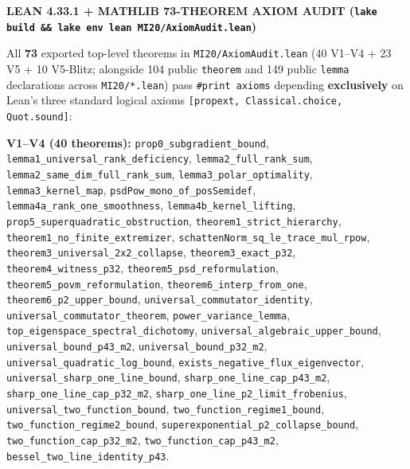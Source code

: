 \documentclass[10pt,letterpaper]{article}
\begin{document}
\begin{tcolorbox}[leanbox]
{\sffamily\footnotesize\bfseries\color{leanborder}LEAN 4.33.1 + MATHLIB 73-THEOREM AXIOM AUDIT (\texttt{lake build \&\& lake env lean MI20/AxiomAudit.lean})}\par\vspace{2.5pt}
{\raggedright\small All \textbf{73} exported top-level theorems in \texttt{MI20/AxiomAudit.lean} (40 V1--V4 + 23 V5 + 10 V5-Blitz; alongside 104 public \texttt{theorem} and 149 public \texttt{lemma} declarations across \texttt{MI20/*.lean}) pass \texttt{\#print axioms} depending \textbf{exclusively} on Lean's three standard logical axioms \texttt{[propext, Classical.choice, Quot.sound]}:\par\vspace{1.5pt}
\textbf{V1--V4 (40 theorems):} \texttt{prop0\_subgradient\_bound}, \texttt{lemma1\_universal\_rank\_deficiency}, \texttt{lemma2\_full\_rank\_sum}, \texttt{lemma2\_same\_dim\_full\_rank\_sum}, \texttt{lemma3\_polar\_optimality}, \texttt{lemma3\_kernel\_map}, \texttt{psdPow\_mono\_of\_posSemidef}, \texttt{lemma4a\_rank\_one\_smoothness}, \texttt{lemma4b\_kernel\_lifting}, \texttt{prop5\_superquadratic\_obstruction}, \texttt{theorem1\_strict\_hierarchy}, \texttt{theorem1\_no\_finite\_extremizer}, \texttt{schattenNorm\_sq\_le\_trace\_mul\_rpow}, \texttt{theorem3\_universal\_2x2\_collapse}, \texttt{theorem3\_exact\_p32}, \texttt{theorem4\_witness\_p32}, \texttt{theorem5\_psd\_reformulation}, \texttt{theorem5\_povm\_reformulation}, \texttt{theorem6\_interp\_from\_one}, \texttt{theorem6\_p2\_upper\_bound}, \texttt{universal\_commutator\_identity}, \texttt{universal\_commutator\_theorem}, \texttt{power\_variance\_lemma}, \texttt{top\_eigenspace\_spectral\_dichotomy}, \texttt{universal\_algebraic\_upper\_bound}, \texttt{universal\_bound\_p43\_m2}, \texttt{universal\_bound\_p32\_m2}, \texttt{universal\_quadratic\_log\_bound}, \texttt{exists\_negative\_flux\_eigenvector}, \texttt{universal\_sharp\_one\_line\_bound}, \texttt{sharp\_one\_line\_cap\_p43\_m2}, \texttt{sharp\_one\_line\_cap\_p32\_m2}, \texttt{sharp\_one\_line\_p2\_limit\_frobenius}, \texttt{universal\_two\_function\_bound}, \texttt{two\_function\_regime1\_bound}, \texttt{two\_function\_regime2\_bound}, \texttt{superexponential\_p2\_collapse\_bound}, \texttt{two\_function\_cap\_p32\_m2}, \texttt{two\_function\_cap\_p43\_m2}, \texttt{bessel\_two\_line\_identity\_p43}.\par\vspace{1.5pt}
}
\end{tcolorbox}
\end{document}
